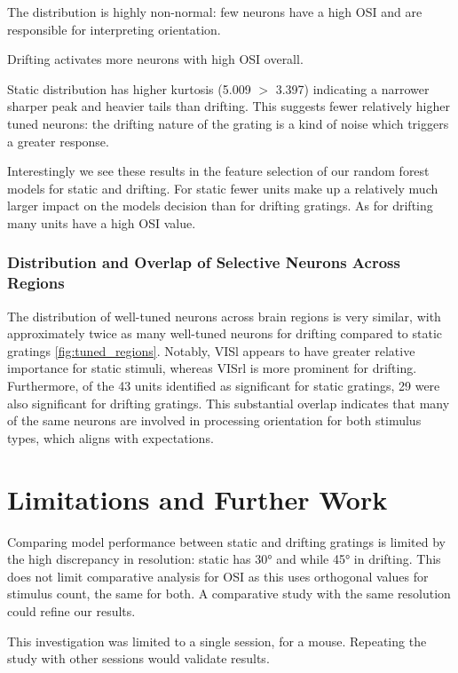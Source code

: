 \documentclass[10pt,twocolumn]{article}
\begin{document}
The distribution is highly non-normal: few neurons have a high OSI and are responsible for interpreting orientation.

Drifting activates more neurons with high OSI overall.

Static distribution has higher kurtosis (5.009 $>$ 3.397) indicating a narrower sharper peak and heavier tails than drifting. This suggests fewer relatively higher tuned neurons: the drifting nature of the grating is a kind of noise which triggers a greater response.

Interestingly we see these results in the feature selection of our random forest models for static and drifting. For static fewer units make up a relatively much larger impact on the models decision than for drifting gratings. As for drifting many units have a high OSI value. 

\subsubsection{Distribution and Overlap of Selective Neurons Across Regions}

The distribution of well-tuned neurons across brain regions is very similar, with approximately twice as many well-tuned neurons for drifting compared to static gratings \ref{fig:tuned_regions}. Notably, VISl appears to have greater relative importance for static stimuli, whereas VISrl is more prominent for drifting. Furthermore, of the 43 units identified as significant for static gratings, 29 were also significant for drifting gratings. This substantial overlap indicates that many of the same neurons are involved in processing orientation for both stimulus types, which aligns with expectations.

\section{Limitations and Further Work}

Comparing model performance between static and drifting gratings is limited by the high discrepancy in resolution: static has 30° and while 45° in drifting. This does not limit comparative analysis for OSI as this uses orthogonal values for stimulus count, the same for both. A comparative study with the same resolution could refine our results.

This investigation was limited to a single session, for a mouse. Repeating the study with other sessions would validate results.
\end{document}
